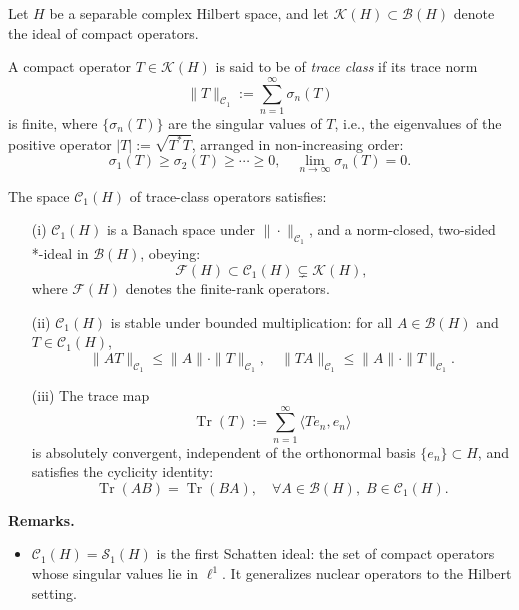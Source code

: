 \begin{definition}\label{def:trace-class-operator}
Let \( H \) be a separable complex Hilbert space, and let \( \mathcal{K}(H) \subset \mathcal{B}(H) \) denote the ideal of compact operators.

A compact operator \( T \in \mathcal{K}(H) \) is said to be of \emph{trace class} if its trace norm
\[
\| T \|_{\mathcal{C}_1} := \sum_{n=1}^\infty \sigma_n(T)
\]
is finite, where \( \{\sigma_n(T)\} \) are the singular values of \( T \), i.e., the eigenvalues of the positive operator \( |T| := \sqrt{T^* T} \), arranged in non-increasing order:
\[
\sigma_1(T) \ge \sigma_2(T) \ge \cdots \ge 0, \quad \lim_{n \to \infty} \sigma_n(T) = 0.
\]

The space \( \mathcal{C}_1(H) \) of trace-class operators satisfies:

\begin{enumerate}
    \item[\textup{(i)}] \( \mathcal{C}_1(H) \) is a Banach space under \( \| \cdot \|_{\mathcal{C}_1} \), and a norm-closed, two-sided *-ideal in \( \mathcal{B}(H) \), obeying:
    \[
    \mathcal{F}(H) \subset \mathcal{C}_1(H) \subsetneq \mathcal{K}(H),
    \]
    where \( \mathcal{F}(H) \) denotes the finite-rank operators.

    \item[\textup{(ii)}] \( \mathcal{C}_1(H) \) is stable under bounded multiplication: for all \( A \in \mathcal{B}(H) \) and \( T \in \mathcal{C}_1(H) \),
    \[
    \| A T \|_{\mathcal{C}_1} \le \|A\| \cdot \|T\|_{\mathcal{C}_1}, \quad
    \| T A \|_{\mathcal{C}_1} \le \|A\| \cdot \|T\|_{\mathcal{C}_1}.
    \]

    \item[\textup{(iii)}] The trace map
    \[
    \operatorname{Tr}(T) := \sum_{n=1}^\infty \langle T e_n, e_n \rangle
    \]
    is absolutely convergent, independent of the orthonormal basis \( \{ e_n \} \subset H \), and satisfies the cyclicity identity:
    \[
    \operatorname{Tr}(AB) = \operatorname{Tr}(BA), \quad \forall A \in \mathcal{B}(H),\; B \in \mathcal{C}_1(H).
    \]
\end{enumerate}

\medskip
\noindent\textbf{Remarks.}
\begin{itemize}
    \item \( \mathcal{C}_1(H) = \mathcal{S}_1(H) \) is the first Schatten ideal: the set of compact operators whose singular values lie in \( \ell^1 \). It generalizes nuclear operators to the Hilbert setting.


\end{itemize}
\end{definition}

